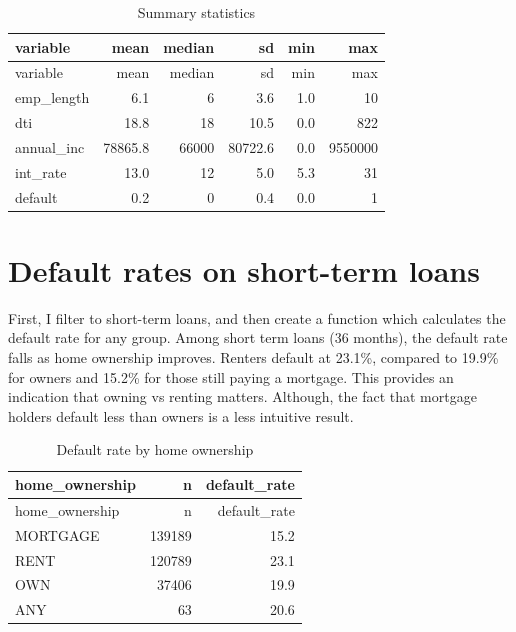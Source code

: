 \documentclass[11pt,preprint]{elsarticle}
\numberwithin{equation}{section}
\numberwithin{figure}{section}
\numberwithin{table}{section}
\begin{document}
\begin{longtable}[]{@{}lrrrrr@{}}
\caption{Summary statistics}\tabularnewline
\toprule\noalign{}
variable & mean & median & sd & min & max \\
\midrule\noalign{}
\endfirsthead
\toprule\noalign{}
variable & mean & median & sd & min & max \\
\midrule\noalign{}
\endhead
\bottomrule\noalign{}
\endlastfoot
emp\_length & 6.1 & 6 & 3.6 & 1.0 & 10 \\
dti & 18.8 & 18 & 10.5 & 0.0 & 822 \\
annual\_inc & 78865.8 & 66000 & 80722.6 & 0.0 & 9550000 \\
int\_rate & 13.0 & 12 & 5.0 & 5.3 & 31 \\
default & 0.2 & 0 & 0.4 & 0.0 & 1 \\
\end{longtable}

\section{Default rates on short-term
loans}\label{default-rates-on-short-term-loans}

First, I filter to short-term loans, and then create a function which
calculates the default rate for any group. Among short term loans (36
months), the default rate falls as home ownership improves. Renters
default at 23.1\%, compared to 19.9\% for owners and 15.2\% for those
still paying a mortgage. This provides an indication that owning vs
renting matters. Although, the fact that mortgage holders default less
than owners is a less intuitive result.

\begin{longtable}[]{@{}lrr@{}}
\caption{Default rate by home ownership}\tabularnewline
\toprule\noalign{}
home\_ownership & n & default\_rate \\
\midrule\noalign{}
\endfirsthead
\toprule\noalign{}
home\_ownership & n & default\_rate \\
\midrule\noalign{}
\endhead
\bottomrule\noalign{}
\endlastfoot
MORTGAGE & 139189 & 15.2 \\
RENT & 120789 & 23.1 \\
OWN & 37406 & 19.9 \\
ANY & 63 & 20.6 \\
\end{longtable}
\end{document}
